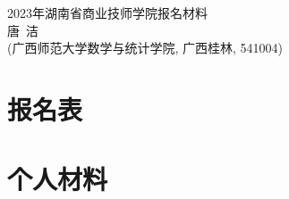 \documentclass[UFT8]{ctexart}%
\begin{document}
\thispagestyle{empty} %
\vspace*{3cm}
\begin{center}
{{\LARGE\heiti 2023年湖南省商业技师学院报名材料}\\[0.6cm]
{\normalsize 唐\ 洁}\\[0.1cm]
{\small(广西师范大学数学与统计学院, 广西桂林, 541004)}}
\end{center}

\clearpage%
\tableofcontents%
\thispagestyle{empty} %

\clearpage%
\setcounter{page}{1}%

\section{报名表}

%
%


%

%

\section{个人材料}
\end{document}
